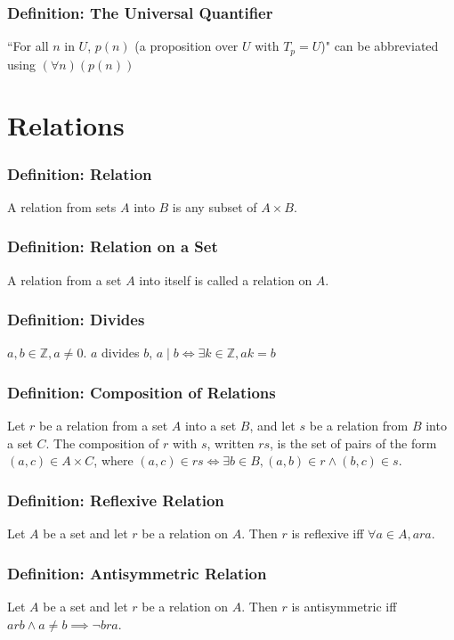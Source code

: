 \documentclass{article}
\begin{document}
\subsubsection*{Definition: The Universal Quantifier}
``For all $n$ in $U$, $p(n)$ (a proposition over $U$ with $T_p = U$)" can be abbreviated using $(\forall n)(p(n))$

\section{Relations}
\subsubsection*{Definition: Relation}
A relation from sets $A$ into $B$ is any subset of $A \times B$.

\subsubsection*{Definition: Relation on a Set}
A relation from a set $A$ into itself is called a relation on $A$. 

\subsubsection*{Definition: Divides}
$a, b \in \mathbb Z, a \neq 0$. $a$ divides $b$, $a \mid b \iff \exists k \in \mathbb Z , a k = b$

\subsubsection*{Definition: Composition of Relations}
Let $r$ be a relation from a set $A$ into a set $B$, and let $s$ be a relation from $B$ into a set $C$. The composition of $r$ with $s$, written $rs$, is the set of pairs of the form $(a,c) \in A \times C$, where $(a,c) \in rs \iff \exists b \in B, (a,b)\in r \land (b,c) \in s$.

\subsubsection*{Definition: Reflexive Relation}
Let $A$ be a set and let $r$ be a relation on $A$. Then $r$ is reflexive iff $\forall a \in A, ara$.

\subsubsection*{Definition: Antisymmetric Relation}
Let $A$ be a set and let $r$ be a relation on $A$. Then $r$ is antisymmetric iff $arb \land a \neq b \implies \neg bra$.
\end{document}
